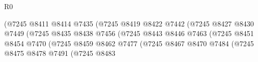 \begin{lexlean}{R0}
\begin{coremodule}
                                                      (@7245
                                                        @8411
                                                        @8414
                                                        @7435
                                                        (@7245
                                                          @8419
                                                          @8422
                                                          @7442
                                                          (@7245
                                                            @8427
                                                            @8430
                                                            @7449
                                                            (@7245
                                                              @8435
                                                              @8438
                                                              @7456
                                                              (@7245
                                                                @8443
                                                                @8446
                                                                @7463
                                                                (@7245
                                                                  @8451
                                                                  @8454
                                                                  @7470
                                                                  (@7245
                                                                    @8459
                                                                    @8462
                                                                    @7477
                                                                    (@7245
                                                                      @8467
                                                                      @8470
                                                                      @7484
                                                                      (@7245
                                                                        @8475
                                                                        @8478
                                                                        @7491
                                                                        (@7245
                                                                          @8483

\end{coremodule}
\end{lexlean}
